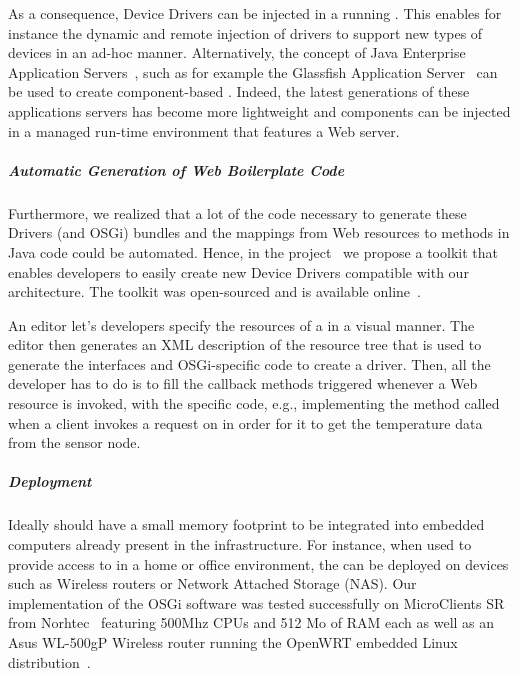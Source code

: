 As a consequence, Device Drivers can be injected in a running \sg{}. This enables for instance the dynamic and remote injection of drivers to support new types of devices in an ad-hoc manner. Alternatively, the concept of Java Enterprise Application Servers~\cite{Goncalves2010}, such as for example the Glassfish Application Server~ can be used to create component-based \sgs{}. Indeed, the latest generations of these applications servers has become more lightweight and components can be injected in a managed run-time environment that features a Web server.

\subparagraph{Automatic Generation of Web Boilerplate Code} Furthermore, we realized that a lot of the code necessary to generate these Drivers (and OSGi) bundles and the mappings from Web resources to methods in Java code could be automated. Hence, in the  project~\cite{Mayer2011} we propose a toolkit that enables developers to easily create new Device Drivers compatible with our \sg{} architecture. The toolkit was open-sourced and is available online~.

An editor let's developers specify the resources of a \st{} in a visual manner. The editor then generates an XML description of the resource tree that is used to generate the interfaces and OSGi-specific code to create a driver. Then, all the developer has to do is to fill the callback methods triggered whenever a Web resource is invoked, with the \sts{} specific code, e.g., implementing the  method called when a client invokes a  request on  in order for it to get the temperature data from the sensor node.

\subparagraph{Deployment}
Ideally \sgs{} should have a small memory footprint to be integrated into embedded computers already present in the infrastructure. For instance, when used to provide access to \sts{} in a home or office environment, the \sgs{} can be deployed on devices such as Wireless routers or Network Attached Storage (NAS). Our implementation of the \sg{} OSGi software was tested successfully on MicroClients SR from Norhtec~ featuring 500Mhz CPUs and 512 Mo of RAM each as well as an Asus WL-500gP Wireless router running the OpenWRT embedded Linux distribution~.

